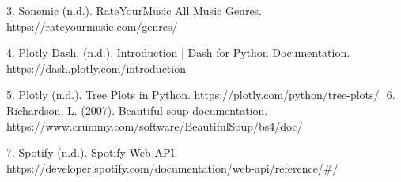\documentclass[fontsize=11pt]{article}
\begin{document}
3. Sonemic (n.d.). RateYourMusic All Music Genres. https://rateyourmusic.com/genres/  \newline

4. Plotly Dash. (n.d.). Introduction | Dash for Python Documentation. https://dash.plotly.com/introduction \newline

5. Plotly (n.d.). Tree Plots in Python. https://plotly.com/python/tree-plots/ \newline
‌
6‌. Richardson, L. (2007). Beautiful soup documentation. https://www.crummy.com/software/BeautifulSoup/bs4/doc/ \newline

7. Spotify (n.d.). Spotify Web API. https://developer.spotify.com/documentation/web-api/reference/\#/ \newline

\end{document}
